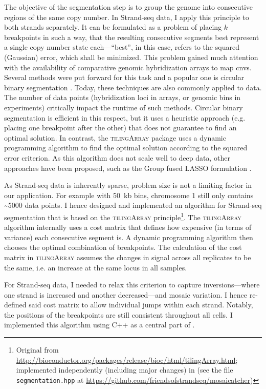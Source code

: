 The objective of the segmentation step is to group the genome into consecutive regions of
the same copy number. In Strand-seq data, I apply this principle to both strands
separately. It can be formulated as a problem of placing $k$
breakpoints in such a way, that the resulting consecutive segments best
represent a single copy number state each---``best'', in this case, refers to
the squared (Gaussian) error, which shall be minimized. This problem gained much attention with the
availability of comparative genomic hybridization arrays to map \acp{cnv}.
Several methods were put forward for this task and a popular one is circular
binary segmentation \citep{Olshen2004,Venkatraman2007}. Today, these techniques
are also commonly applied to \mps data. The number of data points (hybridization
loci in arrays, or genomic bins in \mps experiments) critically impact the
runtime of such methods. Circular binary segmentation is efficient in this
respect, but it uses a heuristic approach (e.g. placing one breakpoint after the
other) that does not guarantee to find an optimal solution. In contrast, the
\textsc{tilingArray} \citep{Huber2006} package uses a dynamic programming
algorithm to find the optimal solution according to the squared error criterion.
As this algorithm does not scale well to deep \mps data, other approaches have
been proposed, such as the Group fused LASSO formulation \citep{Bleakley2011}.

As Strand-seq data is inherently sparse, problem size is not a limiting factor
in our application. For example with 50~kb bins, chromosome 1 still only
contains \textasciitilde5000 data points. I hence designed and implemented an
algorithm for Strand-seq segmentation that is based on the \textsc{tilingArray}
principle\footnote{Original from \url{http://bioconductor.org/packages/release/bioc/html/tilingArray.html};
    implemented independently (including major changes) in \mc (see the file
    \texttt{segmentation.hpp} at \url{https://github.com/friendsofstrandseq/mosaicatcher})}.
The \textsc{tilingArray} algorithm internally uses a cost matrix that defines
how expensive (in terms of variance) each consecutive segment is. A dynamic
programming algorithm then chooses the optimal combination of breakpoints. The
calculation of the cost matrix in \textsc{tilingArray} assumes the changes in
signal across all replicates to be the same, i.e. an increase at the same locus
in all samples.

For Strand-seq data, I needed to relax this criterion to capture
inversions---where one strand is increased and another decreased---and mosaic
variation. I hence re-defined said cost matrix to allow individual jumps within
each strand. Notably, the positions of the breakpoints are still consistent
throughout all cells. I implemented this algorithm using C++ as a central part of \mc.







